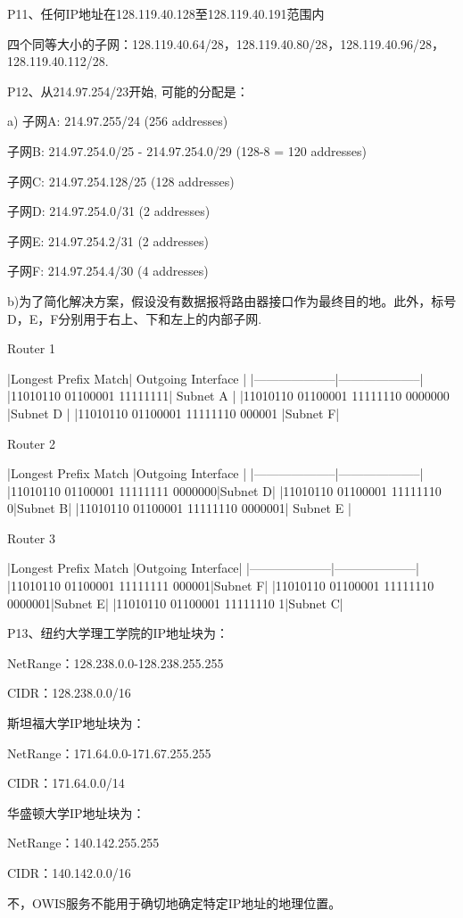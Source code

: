 \documentclass[11pt,UTF8,twoside]{article}
\begin{document}
	P11、任何IP地址在128.119.40.128至128.119.40.191范围内
	
	四个同等大小的子网：128.119.40.64/28，128.119.40.80/28，128.119.40.96/28， 128.119.40.112/28.
	
	P12、从214.97.254/23开始, 可能的分配是：
	
	a) 子网A: 214.97.255/24 (256 addresses) 
	
	子网B: 214.97.254.0/25 - 214.97.254.0/29 (128-8 = 120 addresses) 
	
	子网C: 214.97.254.128/25 (128 addresses) 
	
	子网D: 214.97.254.0/31 (2 addresses) 
	
	子网E: 214.97.254.2/31 (2 addresses) 
	
	子网F: 214.97.254.4/30 (4 addresses) 
	
	b)为了简化解决方案，假设没有数据报将路由器接口作为最终目的地。此外，标号D，E，F分别用于右上、下和左上的内部子网.
	
	Router 1
	
	|Longest Prefix Match| Outgoing Interface |
	|--------------------|--------------------|
	|11010110 01100001 11111111| Subnet A |
	|11010110 01100001 11111110 0000000 |Subnet D |
	|11010110 01100001 11111110 000001 |Subnet F| 
	
	Router 2
	
	|Longest Prefix Match |Outgoing Interface |
	|--------------------|--------------------|
	|11010110 01100001 11111111 0000000|Subnet D|
	|11010110 01100001 11111110 0|Subnet B|
	|11010110 01100001 11111110 0000001| Subnet E |
	
	Router 3
	
	|Longest Prefix Match |Outgoing Interface| 
	|--------------------|--------------------|
	|11010110 01100001 11111111 000001|Subnet F|
	|11010110 01100001 11111110 0000001|Subnet E|
	|11010110 01100001 11111110 1|Subnet C|
	
	P13、纽约大学理工学院的IP地址块为：
	
	NetRange：128.238.0.0-128.238.255.255 
	
	CIDR：128.238.0.0/16
	
	斯坦福大学IP地址块为：
	
	NetRange：171.64.0.0-171.67.255.255 
	
	CIDR：171.64.0.0/14
	
	华盛顿大学IP地址块为：
	
	NetRange：140.142.255.255 
	
	CIDR：140.142.0.0/16 
	
	不，OWIS服务不能用于确切地确定特定IP地址的地理位置。
	
\end{document}

